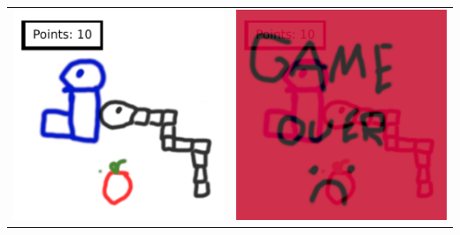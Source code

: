 \documentclass[a4paper]{paper}
\begin{document}
\begin{center}
\begin{tabular}{c c}
        \includegraphics[scale=0.5]{imgs/m5.png}&
        \includegraphics[scale=0.5]{imgs/m6.png}\\
    \end{tabular}
\end{center}
\end{document}
